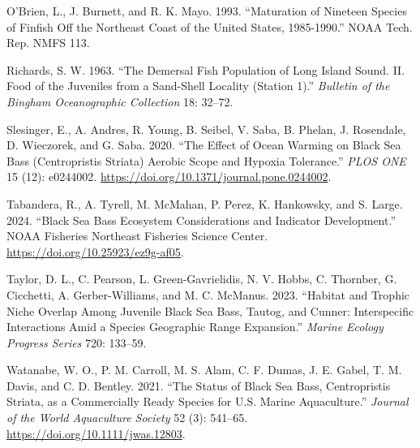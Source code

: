 \documentclass[
  letterpaper,
  DIV=11,
  numbers=noendperiod]{scrartcl}
\newlength{\cslhangindent}
\newenvironment{CSLReferences}[2] %
 {\begin{list}{}{%
  \setlength{\itemindent}{0pt}
  \setlength{\leftmargin}{0pt}
  \setlength{\parsep}{0pt}
  \ifodd #1
   \setlength{\leftmargin}{\cslhangindent}
   \setlength{\itemindent}{-1\cslhangindent}
  \fi
  \setlength{\itemsep}{#2\baselineskip}}}
 {\end{list}}
\begin{document}
\begin{CSLReferences}{1}{0}
O'Brien, L., J. Burnett, and R. K. Mayo. 1993. {``Maturation of Nineteen
Species of Finfish Off the Northeast Coast of the {U}nited {S}tates,
1985-1990.''} NOAA Tech. Rep. NMFS 113.

Richards, S. W. 1963. {``The Demersal Fish Population of {L}ong {I}sland
{S}ound. {II}. {F}ood of the Juveniles from a Sand-Shell Locality
({S}tation 1).''} \emph{Bulletin of the Bingham Oceanographic
Collection} 18: 32--72.

Slesinger, E., A. Andres, R. Young, B. Seibel, V. Saba, B. Phelan, J.
Rosendale, D. Wieczorek, and G. Saba. 2020. {``The Effect of Ocean
Warming on Black Sea Bass ({C}entropristis Striata) Aerobic Scope and
Hypoxia Tolerance.''} \emph{PLOS ONE} 15 (12): e0244002.
\url{https://doi.org/10.1371/journal.pone.0244002}.

Tabandera, R., A. Tyrell, M. McMahan, P. Perez, K. Hankowsky, and S.
Large. 2024. {``Black Sea Bass Ecosystem Considerations and Indicator
Development.''} NOAA Fisheries Northeast Fisheries Science Center.
\url{https://doi.org/10.25923/ez9g-af05}.

Taylor, D. L., C. Pearson, L. Green-Gavrielidis, N. V. Hobbs, C.
Thornber, G. Cicchetti, A. Gerber-Williams, and M. C. McManus. 2023.
{``Habitat and Trophic Niche Overlap Among Juvenile Black Sea Bass,
Tautog, and Cunner: Interspecific Interactions Amid a Species Geographic
Range Expansion.''} \emph{Marine Ecology Progress Series} 720: 133--59.

Watanabe, W. O., P. M. Carroll, M. S. Alam, C. F. Dumas, J. E. Gabel, T.
M. Davis, and C. D. Bentley. 2021. {``The Status of Black Sea Bass,
{C}entropristis Striata, as a Commercially Ready Species for {U}.{S}.
Marine Aquaculture.''} \emph{Journal of the World Aquaculture Society}
52 (3): 541--65. \url{https://doi.org/10.1111/jwas.12803}.

\end{CSLReferences}
\end{document}
